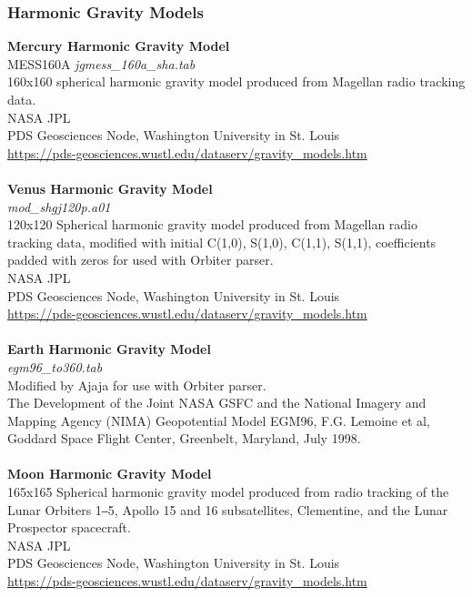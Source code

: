 \documentclass[Orbiter User Manual.tex]{subfiles}
\begin{document}
\subsubsection{Harmonic Gravity Models}
\textbf{Mercury Harmonic Gravity Model}\\
MESS160A	\textit{jgmess\_160a\_sha.tab}\\
160x160 spherical harmonic gravity model produced from Magellan radio tracking data.\\
NASA JPL\\
PDS Geosciences Node, Washington University in St. Louis\\
\url{https://pds-geosciences.wustl.edu/dataserv/gravity_models.htm}\\
\\
\textbf{Venus Harmonic Gravity Model}\\
\textit{mod\_shgj120p.a01}\\
120x120 Spherical harmonic gravity model produced from Magellan radio tracking data, modified with initial C(1,0), S(1,0), C(1,1), S(1,1), coefficients padded with zeros for used with Orbiter parser.\\
NASA JPL\\
PDS Geosciences Node, Washington University in St. Louis\\
\url{https://pds-geosciences.wustl.edu/dataserv/gravity_models.htm}\\
\\
\textbf{Earth Harmonic Gravity Model}\\
\textit{egm96\_to360.tab}\\
Modified by Ajaja for use with Orbiter parser.\\
The Development of the Joint NASA GSFC and the National Imagery and Mapping Agency (NIMA) Geopotential Model EGM96, F.G. Lemoine et al, Goddard Space Flight Center, Greenbelt, Maryland, July 1998.\\
\\
\textbf{Moon Harmonic Gravity Model}\\
165x165 Spherical harmonic gravity model produced from radio tracking of the Lunar Orbiters 1‒5, Apollo 15 and 16 subsatellites, Clementine, and the Lunar Prospector spacecraft.\\
NASA JPL\\
PDS Geosciences Node, Washington University in St. Louis\\
\url{https://pds-geosciences.wustl.edu/dataserv/gravity_models.htm}\\
\\
\end{document}
